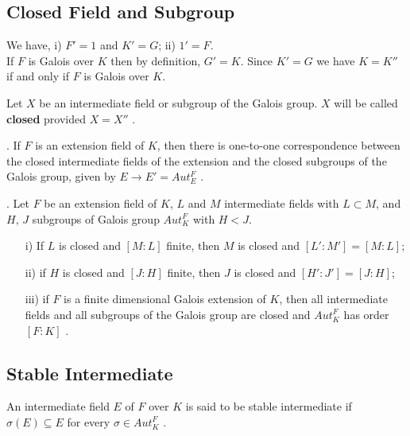 \subsection{Closed Field and Subgroup}
We have, \hspace{2cm}
i) \(F'=1\) and \(K'=G\); \hspace{3cm} ii) \(1'=F\).\\

If \(F\) is Galois over \(K\) then by definition, \(G'=K\). Since \(K'=G\) we have \(K=K''\) if and only if \(F\) is Galois over \(K\).

\begin{definition}
  Let \(X\) be an intermediate field or subgroup of the Galois group. \(X\) will be called \textbf{closed} provided \(X=X''\) \cite{hunger}.\\
\end{definition}

\begin{lemma}. If \(F\) is an extension field of \(K\), then there is one-to-one correspondence between the closed intermediate fields of the extension and the closed subgroups of the Galois group, given by \(E \rightarrow E' =  Aut_E^F\) \cite{hunger}.
\end{lemma}

\begin{lemma}. Let \(F\) be an extension field of \(K\), \(L\) and \(M\) intermediate fields with \(L \subset M\), and \(H\), \(J\) subgroups of Galois group \(Aut_K^F\) with \(H<J\).
  \begin{enumerate}
  \item[i)] If \(L\) is closed and \([M:L]\) finite, then \(M\) is closed and \([L':M']=[M:L]\);
  \item[ii)] if \(H\) is closed and \([J:H]\) finite, then \(J\) is closed and \([H':J']=[J:H]\);
  \item[iii)] if \(F\) is a finite dimensional Galois extension of \(K\), then all intermediate fields and all subgroups of the Galois group are closed and \(Aut_K^F\) has order \([F:K]\) \cite{hunger}.
  \end{enumerate}
\end{lemma}


\subsection{Stable Intermediate}
\begin{definition}
  An intermediate field \(E\) of \(F\) over \(K\) is said to be stable intermediate if \(\sigma(E) \subseteq E\) for every \(\sigma \in Aut_K^F\) \cite{hunger}.
\end{definition}

